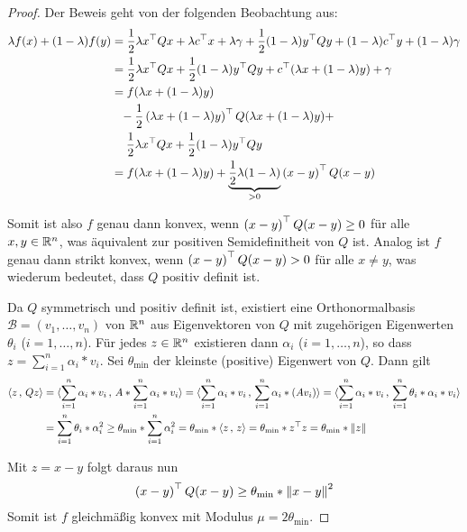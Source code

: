 \documentclass[ %
ngerman, %
a4paper, 
11pt,%
sectionreset, %
chapterstyle=framed, %
sectionstyle=pure, %
titlefont=osfamily %
]{../texmf/tex/latex/mathscriptMathTUD/mathscriptMathTUD}
\begin{document}
\begin{proof}
	Der Beweis geht von der folgenden Beobachtung aus:
	\begin{align*}
		\lambda f(x) + (1-\lambda) f(y)
		&= \frac{1}{2} \lambda x^{\top} Q x + \lambda c^{\top} x + \lambda \gamma + \frac{1}{2} (1-\lambda) y^{\top} Q y + (1-\lambda) c^{\top} y + (1-\lambda) \gamma \\
		&= \frac{1}{2} \lambda x^{\top} Q x + \frac{1}{2} (1-\lambda) y^{\top} Q y + c^{\top} (\lambda x + (1-\lambda) y) + \gamma \\
		&= f(\lambda x + (1 - \lambda) y) \\
		&\phantom{=} - \frac{1}{2} \left( \lambda x + (1 - \lambda) y \right)^{\top} Q (\lambda x + (1 - \lambda) y) + \\
		&\phantom{=} \enskip \frac{1}{2} \lambda x^{\top} Q x + \frac{1}{2} (1-\lambda) y^{\top} Q y\\
		&= f(\lambda x + (1 - \lambda) y) + \underbrace{\frac{1}{2} \lambda (1-\lambda)}_{> 0} \left( x-y \right)^{\top} Q (x-y)
	\end{align*}

	Somit ist also $f$ genau dann konvex, wenn $\left( x-y \right)^{\top} Q (x-y) \geq 0$ für alle $x,y \in \mathbb{R}^n$, was äquivalent zur positiven Semidefinitheit von $Q$ ist. Analog ist $f$ genau dann strikt konvex, wenn $\left( x-y \right)^{\top} Q (x-y) > 0$ für alle $x \neq y$, was wiederum bedeutet, dass $Q$ positiv definit ist.
	
	Da $Q$ symmetrisch und positiv definit ist, existiert eine Orthonormalbasis $\mathcal{B} = (v_1 , \dots , v_n)$ von $\mathbb{R}^n$ aus Eigenvektoren von $Q$ mit zugehörigen Eigenwerten $\theta_i$ ($i=1, \dots , n$). Für jedes $z \in \mathbb{R}^n$ existieren dann $\alpha_i$ ($i = 1,\dots, n$), so dass $z = \sum_{i=1}^n \alpha_i * v_i$. Sei $\theta_{\min}$ der kleinste (positive) Eigenwert von $Q$. Dann gilt
	\begin{align*}
		\langle z\, ,\, Qz \rangle 
		&= \langle \sum_{i=1}^n \alpha_i * v_i\, ,\, A * \sum_{i=1}^n \alpha_i * v_i \rangle
		= \langle \sum_{i=1}^n \alpha_i * v_i\, ,\, \sum_{i=1}^n \alpha_i * (A v_i) \rangle 
		= \langle \sum_{i=1}^n \alpha_i * v_i\, ,\, \sum_{i=1}^n \theta_i * \alpha_i * v_i \rangle \\
		&= \sum_{i=1}^n \theta_i * \alpha_i^2 
		\geq \theta_{\min} * \sum_{i=1}^n \alpha_i^2
		= \theta_{\min} * \langle z\, ,\, z \rangle = \theta_{\min} * z^{\top}z = \theta_{\min} * \left\lVert z \right\rVert
	\end{align*}
	
	Mit $z = x-y$ folgt daraus nun
	\begin{align*}
		\left( x-y \right)^{\top} Q (x-y) \geq \theta_{\min} * \left\lVert x-y \right\rVert^2
	\end{align*}
	Somit ist $f$ gleichmäßig konvex mit Modulus $\mu = 2 \theta_{\min}$.
\end{proof}
\end{document}
